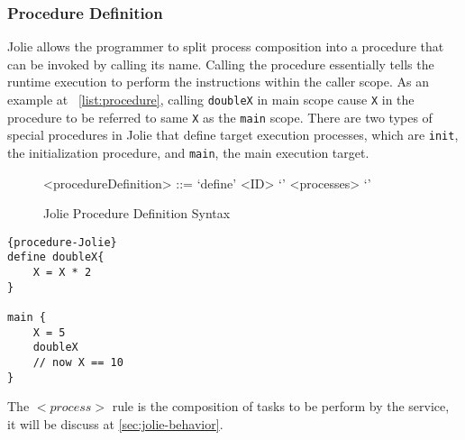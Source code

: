 \subsubsection{Procedure Definition}
\label{sec:jolie-procedure-def}

Jolie allows the programmer to split process composition into a procedure that can be invoked by calling its name. Calling the procedure essentially tells the runtime execution to perform the instructions within the caller scope. As an example at ~\ref{list:procedure}, calling \texttt{doubleX} in main scope cause \texttt{X} in the procedure to be referred to same \texttt{X} as the \texttt{main} scope. There are two types of special procedures in Jolie that define target execution processes, which are \texttt{init}, the initialization procedure, and \texttt{main}, the main execution target.

\begin{figure}[h]
	\begin{framed}
		\begin{grammar}
			<procedureDefinition> ::= `define' <ID> `{' <processes> `}'
		\end{grammar}
	\end{framed}
	\caption{Jolie Procedure Definition Syntax}
\end{figure}


\begin{listing}[h]
\lstset{language=Jolie,
	style=codeStyle
}
\begin{lstlisting}[frame=tlrb, caption= {Jolie procedure example}, label={list:procedure}]{procedure-Jolie}
define doubleX{
	X = X * 2
}

main {
	X = 5
	doubleX
	// now X == 10
}
\end{lstlisting}
\end{listing}

The \(<process>\) rule is the composition of tasks to be perform by the service, it will be discuss at \autoref{sec:jolie-behavior}.

\FloatBarrier
